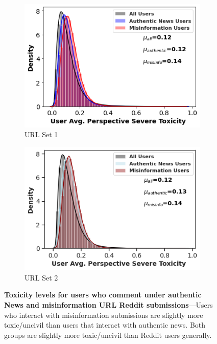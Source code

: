 \begin{figure}
\begin{subfigure}{.4\textwidth}
  \centering
  \includegraphics[width=1\linewidth]{figures/user_toxicity_above10.png}
  \caption{URL Set 1}
\label{fig:harmonic-sub1}
\end{subfigure}
\begin{subfigure}{.4\textwidth}
  \centering
  \includegraphics[width=1\linewidth]{figures/user_toxicity_above10_2.png}
    \caption{URL Set 2}
  \label{fig:pagerank-sub2}
\end{subfigure}

\caption{\textbf{Toxicity levels for users who comment under authentic News and misinformation URL Reddit submissions}---Users who interact with misinformation submissions are slightly more toxic/uncivil than users that interact with authentic news. Both groups are slightly more toxic/uncivil than Reddit users generally. }
\label{fig:users-misinformation-authentic-toxicity}
\end{figure}



